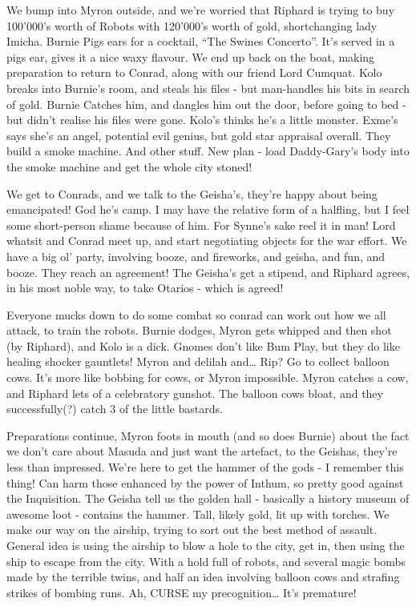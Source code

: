 \begin{multicols}{2}
We bump into Myron outside, and we’re worried that Riphard is trying to buy 100’000’s worth of Robots with 120’000’s worth of gold, shortchanging lady Imicha. Burnie Pigs ears for a cocktail, “The Swines Concerto”. It’s served in a pigs ear, gives it a nice waxy flavour. We end up back on the boat, making preparation to return to Conrad, along with our friend Lord Cumquat. Kolo breaks into Burnie’s room, and steals his files - but man-handles his bits in search of gold. Burnie Catches him, and dangles him out the door, before going to bed - but didn’t realise his files were gone. Kolo’s thinks he’s a little monster. Exme’s says she’s an angel, potential evil genius, but gold star appraisal overall. They build a smoke machine. And other stuff. New plan - load Daddy-Gary’s body into the smoke machine and get the whole city stoned!\medskip

We get to Conrads, and we talk to the Geisha’s, they’re happy about being emancipated! God he’s camp. I may have the relative form of a halfling, but I feel some short-person shame because of him. For Synne’s sake reel it in man! Lord whatsit and Conrad meet up, and start negotiating objects for the war effort. We have a big ol’ party, involving booze, and fireworks, and geisha, and fun, and booze. They reach an agreement! The Geisha’s get a stipend, and Riphard agrees, in his most noble way, to take Otarios - which is agreed!\medskip

Everyone mucks down to do some combat so conrad can work out how we all attack, to train the robots. Burnie dodges, Myron gets whipped and then shot (by Riphard), and Kolo is a dick. Gnomes don’t like Bum Play, but they do like healing shocker gauntlets! Myron and delilah and… Rip? Go to collect balloon cows. It’s more like bobbing for cows, or Myron impossible. Myron catches a cow, and Riphard lets of a celebratory gunshot. The balloon cows bloat, and they successfully(?) catch 3 of the little bastards.\medskip

Preparations continue, Myron foots in mouth (and so does Burnie) about the fact we don’t care about Masuda and just want the artefact, to the Geishas, they’re less than impressed. We’re here to get the hammer of the gods - I remember this thing! Can harm those enhanced by the power of Inthum, so pretty good against the Inquisition. The Geisha tell us the golden hall - basically a history museum of awesome loot - contains the hammer. Tall, likely gold, lit up with torches. We make our way on the airship, trying to sort out the best method of assault. General idea is using the airship to blow a hole to the city, get in, then using the ship to escape from the city. With a hold full of robots, and several magic bombs made by the terrible twins, and half an idea involving balloon cows and strafing strikes of bombing runs. Ah, CURSE my precognition… It’s premature!\medskip


\end{multicols}
